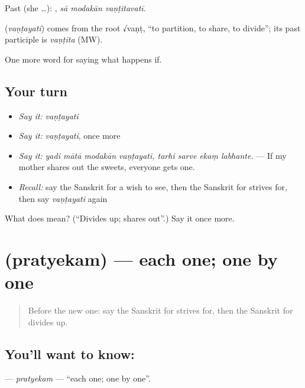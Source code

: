 Past (she …):   , \emph{sā modakān vaṇṭitavatī}.

\begin{cousinweb}
\textbf{} (\emph{vaṇṭayati}) comes from the root √vaṇṭ, \textquotedblleft{}to partition, to share, to divide\textquotedblright{}; its past participle is \emph{vaṇṭita} (MW).
\end{cousinweb}

\begin{grammarlens}[title={What you've built}]
One more word for saying what happens if.
\end{grammarlens}

\subsection*{Your turn}
\begin{itemize}
\raggedright
  \item \emph{Say it:} \emph{vaṇṭayati}
  \item \emph{Say it:} \emph{vaṇṭayati}, once more
  \item \emph{Say it:} \emph{yadi mātā modakān vaṇṭayati, tarhi sarve ekaṃ labhante.} — If my mother shares out the sweets, everyone gets one.
  \item \emph{Recall:} say the Sanskrit for a wish to see, then the Sanskrit for strives for, then say \emph{vaṇṭayati} again
\end{itemize}

\begin{tcolorbox}[breakable,colback=teal!4,colframe=teal!35!black,title={Before you move on}]
What does  mean? (\textquotedblleft{}Divides up; shares out\textquotedblright{}.) Say it once more.
\end{tcolorbox}
\section[\texorpdfstring{\sk{प्रत्येकम्} (pratyekam)}{प्रत्येकम् (pratyekam)}]{ (pratyekam) — each one; one by one}

\label{lesson:SA-C550-pratyekam}



\begin{quote}
Before the new one: say the Sanskrit for strives for, then the Sanskrit for divides up.
\end{quote}

\subsection*{You'll want to know: }
\textbf{} — \emph{pratyekam} — \textquotedblleft{}each one; one by one\textquotedblright{}.

